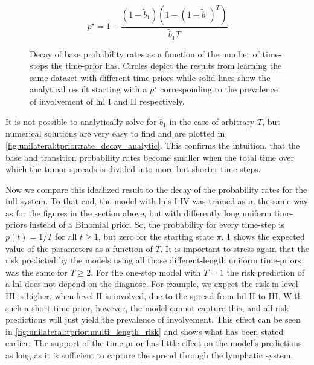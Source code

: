 \documentclass[\relativeRoot/main.tex]{subfiles}
\begin{document}
%
\begin{equation} \label{eq:unilateral:tprior:analytical_result}
    p^{\star} = 1 - \frac{\left(1 - \tilde{b}_1\right) \left( 1 - (1 - \tilde{b}_1)^T \right)}{\tilde{b}_1 T}
\end{equation}
%
\begin{figure}
    \centering
    \def\svgwidth{1.0\textwidth}
    
    \caption[
        Decay of spread probabilities for different time-step supports
    ]{
        Decay of base probability rates as a function of the number of time-steps the time-prior has. Circles depict the results from learning the same dataset with different time-priors while solid lines show the analytical result starting with a $p^{\star}$ corresponding to the prevalence of involvement of \gls{lnl} I and II respectively.
    }
    \label{fig:unilateral:tprior:rate_decay_sampled}
\end{figure}

It is not possible to analytically solve for $\tilde{b}_1$ in the case of arbitrary $T$, but numerical solutions are very easy to find and are plotted in \cref{fig:unilateral:tprior:rate_decay_analytic}. This confirms the intuition, that the base and transition probability rates become smaller when the total time over which the tumor spreads is divided into more but shorter time-steps.

Now we compare this idealized result to the decay of the probability rates for the full system. To that end, the model with \glspl{lnl} I-IV was trained as in the same way as for the figures in the section above, but with differently long uniform time-priors instead of a Binomial prior. So, the probability for every time-step is $p(t)=1/T$ for all $t \geq 1$, but zero for the starting state $\pi$. \cref{fig:unilateral:tprior:rate_decay_sampled} shows the expected value of the parameters as a function of $T$. It is important to stress again that the risk predicted by the models using all those different-length uniform time-priors was the same for $T \geq 2$. For the one-step model with $T=1$ the risk prediction of a \gls{lnl} does not depend on the diagnose. For example, we expect the risk in level III is higher, when level II is involved, due to the spread from \gls{lnl} II to III. With such a short time-prior, however, the model cannot capture this, and all risk predictions will just yield the prevalence of involvement. This effect can be seen in \cref{fig:unilateral:tprior:multi_length_risk} and shows what has been stated earlier: The support of the time-prior has little effect on the model's predictions, as long as it is sufficient to capture the spread through the lymphatic system.
\end{document}

